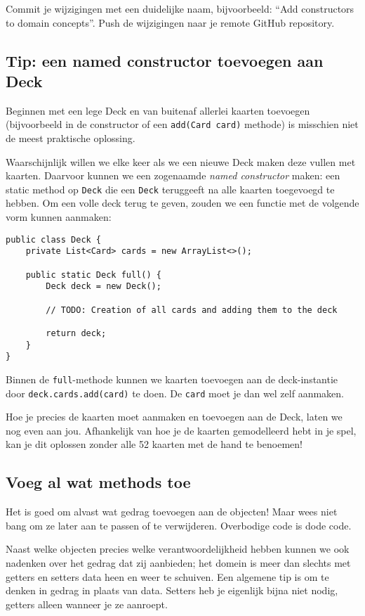 Commit je wijzigingen met een duidelijke naam, 
bijvoorbeeld: ``Add constructors to domain concepts''. 
Push de wijzigingen naar je remote GitHub repository.

\subsection{Tip: een named constructor toevoegen aan Deck}
Beginnen met een lege Deck en van buitenaf allerlei kaarten toevoegen 
(bijvoorbeeld in de constructor of een \texttt{add(Card card)} methode)
is misschien niet de meest praktische oplossing.

Waarschijnlijk willen we elke keer als we een nieuwe Deck maken
deze vullen met kaarten. Daarvoor kunnen we een zogenaamde \textit{named constructor}
maken: een static method op \texttt{Deck} die een \texttt{Deck} teruggeeft 
na alle kaarten toegevoegd te hebben. Om een volle deck terug te geven, zouden 
we een functie met de volgende vorm kunnen aanmaken:

\begin{verbatim}
public class Deck {
    private List<Card> cards = new ArrayList<>();

    public static Deck full() {
        Deck deck = new Deck();

        // TODO: Creation of all cards and adding them to the deck

        return deck;
    }
}
\end{verbatim}

Binnen de \texttt{full}-methode kunnen we kaarten toevoegen aan de 
deck-instantie door \texttt{deck.cards.add(card)} te doen. De \texttt{card}
moet je dan wel zelf aanmaken.

Hoe je precies de kaarten moet aanmaken en toevoegen aan de Deck,
laten we nog even aan jou. Afhankelijk van hoe je de kaarten gemodelleerd hebt 
in je spel, kan je dit oplossen zonder alle 52 kaarten met de hand te benoemen!

\subsection{Voeg al wat methods toe}
Het is goed om alvast wat gedrag toevoegen aan de objecten!
Maar wees niet bang om ze later aan te passen of te verwijderen.
Overbodige code is dode code.

Naast welke objecten precies welke verantwoordelijkheid hebben 
kunnen we ook nadenken over het gedrag dat zij aanbieden; 
het domein is meer dan slechts met getters en setters data heen en weer te schuiven. 
Een algemene tip is om te denken in gedrag in plaats van data. 
Setters heb je eigenlijk bijna niet nodig, getters alleen wanneer je ze aanroept. 

